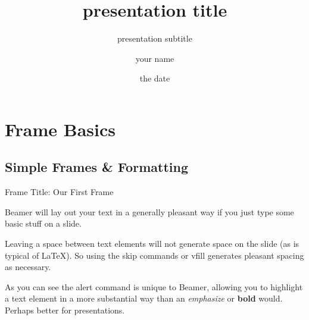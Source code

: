 \documentclass{beamer}
\title{presentation title}						%
\subtitle{presentation subtitle}
\institute{your institutional affiliation}
\author{your name}
\date{the date}								%
\begin{document}
\begin{frame}[plain]							%
	\titlepage
	
\end{frame}



\begin{frame}[plain]

	\tableofcontents							%
	
\end{frame}





\section{Frame Basics}						%
\subsection{Simple Frames \& Formatting}			%

\begin{frame}{Frame Title: Our First Frame}		%
	
	Beamer will lay out your text in a generally pleasant way if you just type some basic stuff on a slide.
	
	\bigskip								%
	
	Leaving a space between text elements will not generate space on the slide (as is typical of \LaTeX). So using the \alert{skip} commands or \alert{vfill} generates pleasant spacing as necessary.
	
	\vfill									%
	
	As you can see the \alert{alert} command is unique to Beamer, allowing you to highlight a text element in a more substantial way than an \emph{emphasize} or \textbf{bold} would. Perhaps better for presentations.
	
\end{frame}
\end{document}
